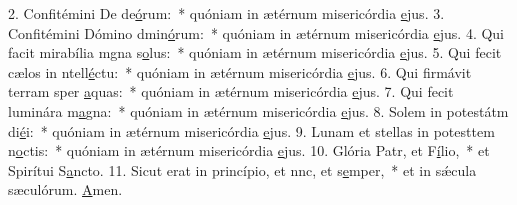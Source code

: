2. Confitémini De de\uline{ó}rum:~* quóniam in ætérnum misericórdia \uline{e}jus.
3. Confitémini Dómino dmin\uline{ó}rum:~* quóniam in ætérnum misericórdia \uline{e}jus.
4. Qui facit mirabília mgna s\uline{o}lus:~* quóniam in ætérnum misericórdia \uline{e}jus.
5. Qui fecit cælos in ntell\uline{é}ctu:~* quóniam in ætérnum misericórdia \uline{e}jus.
6. Qui firmávit terram sper \uline{a}quas:~* quóniam in ætérnum misericórdia \uline{e}jus.
7. Qui fecit luminára m\uline{a}gna:~* quóniam in ætérnum misericórdia \uline{e}jus.
8. Solem in potestátm di\uline{é}i:~* quóniam in ætérnum misericórdia \uline{e}jus.
9. Lunam et stellas in potesttem n\uline{o}ctis:~* quóniam in ætérnum misericórdia \uline{e}jus.
10. Glória Patr, et F\uline{í}lio,~* et Spirítui S\uline{a}ncto.
11. Sicut erat in princípio, et nnc, et s\uline{e}mper,~* et in sǽcula sæculórum. \uline{A}men.
